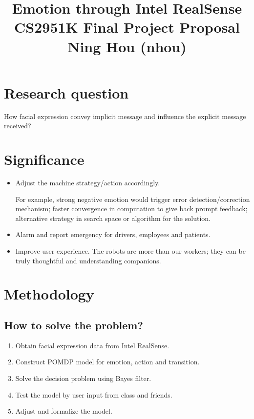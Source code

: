 \documentclass[12pt,letterpaper]{article}
\begin{document}
\title{Emotion through Intel RealSense\\ \vspace{2 mm} {\large CS2951K Final Project Proposal}\\ {\large Ning Hou (nhou)}}

\maketitle

\section{Research question}
How facial expression convey implicit message and influence the explicit message received?

\section{Significance}
\begin{itemize}
\item Adjust the machine strategy/action accordingly. 

For example, strong negative emotion would trigger error detection/correction mechanism; faster convergence in computation to give back prompt feedback; alternative strategy in search space or algorithm for the solution.

\item Alarm and report emergency for drivers, employees and patients.

\item Improve user experience. The robots are more than our workers; they can be truly thoughtful and understanding companions.
\end{itemize}

\section{Methodology}



\subsection{How to solve the problem?}

\begin{enumerate}
\item Obtain facial expression data from Intel RealSense.
\item Construct POMDP model for emotion, action and transition.
\item Solve the decision problem using Bayes filter.
\item Test the model by user input from class and friends.
\item Adjust and formalize the model. 
\end{enumerate}
\end{document}
